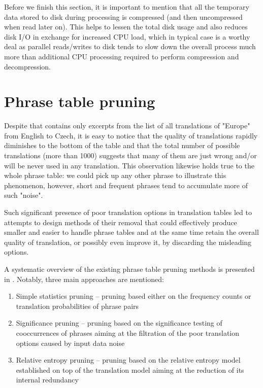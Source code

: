 Before we finish this section, it is important to mention that all
the temporary data stored to disk during processing is compressed
(and then uncompressed when read later on).
This helps to lessen the total disk usage and also reduces disk I/O in exchange for
increased CPU load, which in typical case is a worthy deal as parallel reads/writes
to disk tends to slow down the overall process much more than additional
CPU processing required to perform compression and decompression.

\section{Phrase table pruning}
\label{sec:phrase-table-pruning}

Despite that  contains only excerpts from the list
of all translations of "Europe" from English to Czech, it is easy to notice
that the quality of translations rapidly diminishes to the bottom of the table
and that the total number of possible translations (more than 1000) suggests
that many of them are just wrong and/or will be never used in any translation.
This observation likewise holds true to the whole phrase table: we could pick up
any other phrase to illustrate this phenomenon, however, short and frequent
phrases tend to accumulate more of such "noise".

Such significant presence of poor translation options in translation tables led to
attempts to design methods of their removal that could effectively produce smaller and
easier to handle phrase tables and at the same time retain the overall quality of
translation, or possibly even improve it, by discarding the misleading options.

A systematic overview of the existing phrase table pruning methods is presented in
\citep{zens:systcomp}.
Notably, three main approaches are mentioned:
\begin{enumerate}
  \item Simple statistics pruning -- pruning based either on the frequency counts or
    translation probabilities of phrase pairs
  \item Significance pruning -- pruning based on the significance testing of
    cooccurrences of phrases aiming at the filtration of the poor translation options
    caused by input data noise
  \item Relative entropy pruning -- pruning based on the relative entropy model established
    on top of the translation model aiming at the reduction of its internal redundancy
\end{enumerate}

